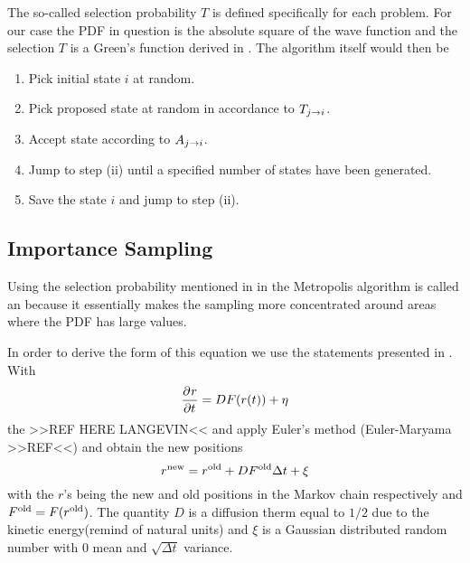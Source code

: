         The so-called selection probability $T$ is defined specifically for
        each problem. For our case the PDF in question is the absolute square
        of the wave function and the selection $T$ is a Green's function
        derived in .  The algorithm itself would then be
            \begin{enumerate}[label=(\roman*)]
                \item Pick initial state $i$ at random.
                \item Pick proposed state at random in accordance to
                    $T_{j\rightarrow i}$.
                \item Accept state according to $A_{j\rightarrow i}$.
                \item Jump to step (ii) until a specified number of states have
                    been generated.
                \item Save the state $i$ and jump to step (ii).
            \end{enumerate}

    \subsection{Importance Sampling\label{susec:impSamp}}
        Using the selection probability mentioned in  in the
        Metropolis algorithm is called an  because
        it essentially makes the sampling more concentrated around areas where
        the PDF has large values.

        In order to derive the form of this equation we use the statements
        presented in . With
            \begin{equation}
                \langevin
                \label{eq:langevin}
            \end{equation}
        the  >>REF HERE LANGEVIN<< and apply Euler's
        method (Euler-Maryama >>REF<<) and obtain the new positions
            \begin{equation}
                r^{\text{new}} = r^{\text{old}} + DF^{\text{old}}\Delta t + \xi
                \label{eq:rnewdef}
            \end{equation}
        with the $r$'s being the new and old positions in the Markov chain
        respectively and $F^{\text{old}}=F(r^{\text{old}})$. The quantity $D$ is a diffusion
        therm equal to $1/2$ due to the kinetic energy(remind of natural units)
        and $\xi$ is a Gaussian distributed random number with $0$ mean and
        $\sqrt{\Delta t}$ variance.

